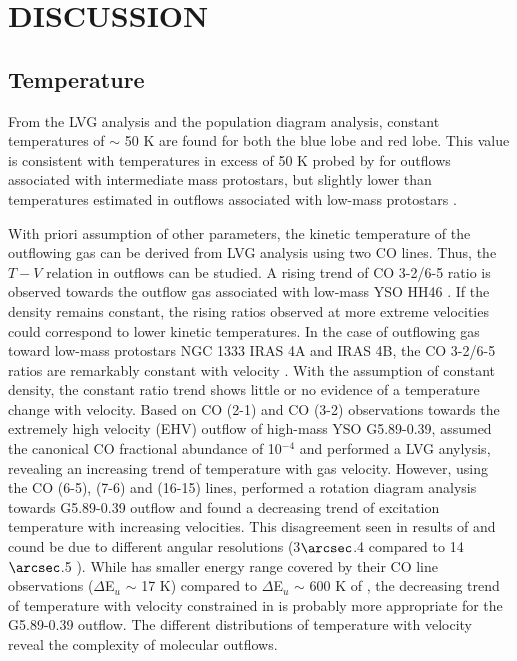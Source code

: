 \section{DISCUSSION}\label{discussion}

\subsection{Temperature}
From the LVG analysis and the population diagram analysis, constant temperatures of $\sim$ 50 K are found for both the blue lobe and red lobe. This value is consistent with temperatures in excess of 50 K probed by \citet{2016A&A...587A..17V} for outflows associated with intermediate mass protostars, but slightly lower than temperatures estimated in outflows associated with low-mass protostars \citep{2009A&A...501..633V, 2012A&A...542A..86Y}.

With priori assumption of other parameters, the kinetic temperature of the outflowing gas can be derived from LVG analysis using two CO lines. Thus, the $T-V$ relation in outflows can be studied. A rising trend of CO 3-2/6-5 ratio is observed towards the outflow gas associated with low-mass YSO HH46 \citep{2009A&A...501..633V}. If the density remains constant, the rising ratios observed at more extreme velocities could correspond to lower kinetic temperatures. In the case of outflowing gas toward low-mass protostars NGC 1333 IRAS 4A and  IRAS 4B, the CO 3-2/6-5 ratios are remarkably constant with velocity \citep{2012A&A...542A..86Y}. With the assumption of constant density, the constant ratio trend shows little or no evidence of a temperature change with velocity. Based on CO (2-1) and CO (3-2) observations towards the extremely high velocity (EHV) outflow of high-mass YSO G5.89-0.39, \citet{2012ApJ...744L..26S} assumed the canonical CO fractional abundance of 10$^{-4}$ and performed a LVG anylysis, revealing an increasing trend of temperature with gas velocity. However, using the CO (6-5), (7-6) and (16-15) lines, \citet{2015A&A...584A..70L} performed a rotation diagram analysis towards G5.89-0.39 outflow and found a decreasing trend of excitation temperature with increasing velocities. This disagreement seen in results of \citet{2012ApJ...744L..26S} and \citet{2015A&A...584A..70L} cound be due to different angular resolutions (3${\arcsec}$.4 compared to 14${\arcsec}$.5 ). While \citet{2012ApJ...744L..26S} has smaller energy range covered by their CO line observations ($\Delta$E$_u$ $\sim$ 17 K) compared to $\Delta$E$_u$ $\sim$ 600 K of \citet{2015A&A...584A..70L}, the decreasing trend of temperature with velocity constrained in \citet{2015A&A...584A..70L} is probably more appropriate for the G5.89-0.39 outflow. The different distributions of temperature with velocity reveal the complexity of molecular outflows. 

